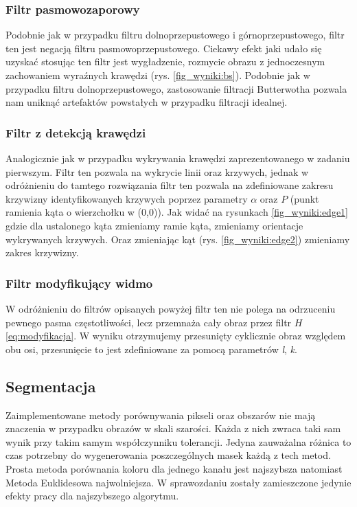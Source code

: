 \documentclass{classrep}
\begin{document}
\subsubsection{Filtr pasmowozaporowy}

Podobnie jak w przypadku filtru dolnoprzepustowego i górnoprzepustowego, filtr ten jest negacją filtru pasmowoprzepustowego. Ciekawy efekt jaki udało się uzyskać stosując ten filtr jest wygładzenie, rozmycie obrazu z jednoczesnym zachowaniem wyraźnych krawędzi (rys. \ref{fig_wyniki:bs}). Podobnie jak w przypadku filtru dolnoprzepustowego, zastosowanie filtracji Butterwotha pozwala nam uniknąć artefaktów powstałych w przypadku filtracji idealnej.

\subsubsection{Filtr z detekcją krawędzi}

Analogicznie jak w przypadku wykrywania krawędzi zaprezentowanego w zadaniu pierwszym. Filtr ten pozwala na wykrycie linii oraz krzywych, jednak w odróżnieniu do tamtego rozwiązania filtr ten pozwala na zdefiniowane zakresu krzywizny identyfikowanych krzywych poprzez parametry $\alpha$ oraz $P$ (punkt ramienia kąta o wierzchołku w (0,0)). Jak widać na rysunkach \ref{fig_wyniki:edge1} gdzie dla ustalonego kąta zmieniamy ramie kąta, zmieniamy orientacje wykrywanych krzywych. Oraz zmieniając kąt (rys. \ref{fig_wyniki:edge2}) zmieniamy zakres krzywizny.

\subsubsection{Filtr modyfikujący widmo}

W odróżnieniu do filtrów opisanych powyżej filtr ten nie polega na odrzuceniu pewnego pasma częstotliwości, lecz przemnaża cały obraz przez filtr $H$ \ref{eq:modyfikacja}. W wyniku otrzymujemy przesunięty cyklicznie obraz względem obu osi, przesunięcie to jest zdefiniowane za pomocą parametrów \emph{l}, \emph{k}.



\subsection{Segmentacja}
Zaimplementowane metody porównywania pikseli oraz obszarów nie mają znaczenia w przypadku obrazów w skali szarości. Każda z nich zwraca taki sam wynik przy takim samym współczynniku tolerancji. Jedyna zauważalna różnica to czas potrzebny do wygenerowania poszczególnych masek każdą z tech metod. Prosta metoda porównania koloru dla jednego kanału jest najszybsza natomiast Metoda Euklidesowa najwolniejsza. W sprawozdaniu zostały zamieszczone jedynie efekty pracy dla najszybszego algorytmu. 
\end{document}
